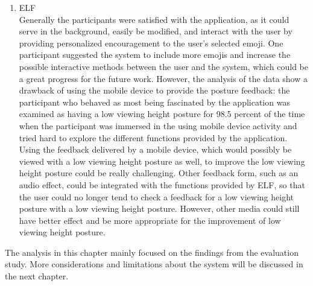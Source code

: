 \begin{enumerate}
\item ELF \hfill \\
Generally the participants were satisfied with the application, as it could serve in the background, easily be modified, and interact with the user by providing personalized encouragement to the user’s selected emoji. One participant suggested the system to include more emojis and increase the possible interactive methods between the user and the system, which could be a great progress for the future work. However, the analysis of the data show a drawback of using the mobile device to provide the posture feedback: the participant who behaved as most being fascinated by the application was examined as having a low viewing height posture for 98.5 percent of the time when the participant was immersed in the using mobile device activity and tried hard to explore the different functions provided by the application. Using the feedback delivered by a mobile device, which would possibly be viewed with a low viewing height posture as well, to improve the low viewing height posture could be really challenging. Other feedback form, such as an audio effect, could be integrated with the functions provided by ELF, so that the user could no longer tend to check a feedback for a low viewing height posture with a low viewing height posture. However, other media could still have better effect and be more appropriate for the improvement of low viewing height posture.
\end{enumerate}

The analysis in this chapter mainly focused on the findings from the evaluation study. More considerations and limitations about the system will be discussed in the next chapter.
